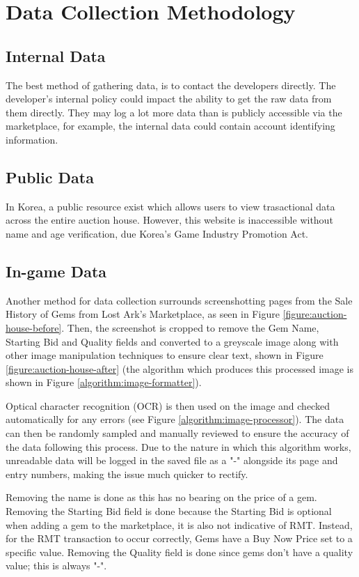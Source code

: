 \documentclass[journal]{IEEEtran}
\begin{document}
\section{Data Collection Methodology}
\subsection{Internal Data}
\noindent The best method of gathering data, is to contact the developers directly. The developer's internal policy could impact the ability to get the raw data from them directly. They may log a lot more data than is publicly accessible via the marketplace, for example, the internal data could contain account identifying information.

\subsection{Public Data}
\noindent In Korea, a public resource exist which allows users to view trasactional data across the entire auction house\cite{LostArkStove2019}. However, this website is inaccessible without name and age verification, due Korea's Game Industry Promotion Act\cite{GIPA2020kr}.

\subsection{In-game Data}
\noindent Another method for data collection surrounds screenshotting pages from the Sale History of Gems from Lost Ark's Marketplace, as seen in Figure \ref{figure:auction-house-before}. Then, the screenshot is cropped to remove the Gem Name, Starting Bid and Quality fields and converted to a greyscale image along with other image manipulation techniques to ensure clear text, shown in Figure \ref{figure:auction-house-after} (the algorithm which produces this processed image is shown in Figure \ref{algorithm:image-formatter}).

Optical character recognition (OCR) is then used on the image and checked automatically for any errors (see Figure \ref{algorithm:image-processor}). The data can then be randomly sampled and manually reviewed to ensure the accuracy of the data following this process. Due to the nature in which this algorithm works, unreadable data will be logged in the saved file as a "-" alongside its page and entry numbers, making the issue much quicker to rectify.

Removing the name is done as this has no bearing on the price of a gem. Removing the Starting Bid field is done because the Starting Bid is optional when adding a gem to the marketplace, it is also not indicative of RMT. Instead, for the RMT transaction to occur correctly, Gems have a Buy Now Price set to a specific value. Removing the Quality field is done since gems don't have a quality value; this is always "-".
\end{document}
